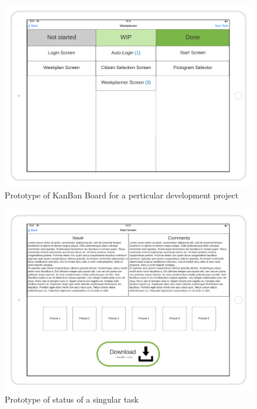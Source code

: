 \begin{figure}[H]
    \includegraphics[width=\textwidth]{images/KanBan-mockup.png}
    \caption{Prototype of KanBan Board for a perticular development project}
\end{figure}

\begin{figure}[H]
    \includegraphics[width=\textwidth]{images/view-a-task-mockup.png}
    \caption{Prototype of status of a singular task}
\end{figure}

